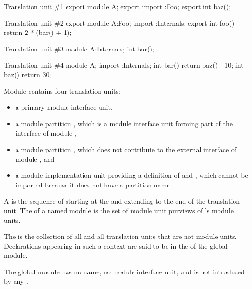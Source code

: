 \pnum
\begin{example}
\begin{codeblocktu}{Translation unit \#1}
export module A;
export import :Foo;
export int baz();
\end{codeblocktu}

\begin{codeblocktu}{Translation unit \#2}
export module A:Foo;
import :Internals;
export int foo() { return 2 * (bar() + 1); }
\end{codeblocktu}

\begin{codeblocktu}{Translation unit \#3}
module A:Internals;
int bar();
\end{codeblocktu}

\begin{codeblocktu}{Translation unit \#4}
module A;
import :Internals;
int bar() { return baz() - 10; }
int baz() { return 30; }
\end{codeblocktu}

Module  contains four translation units:
\begin{itemize}
\item a primary module interface unit,
\item a module partition , which is a module interface unit
forming part of the interface of module ,
\item a module partition , which does not contribute
to the external interface of module , and
\item a module implementation unit providing
a definition of  and ,
which cannot be imported because
it does not have a partition name.
\end{itemize}
\end{example}

\pnum
A  is
the sequence of 
starting at the 
and extending to the end of the translation unit.
The 
of a named module  is the set of module unit purviews
of 's module units. 

\pnum
The  is the collection of all
and all translation units that are not module units.
Declarations appearing in such a context
are said to be in the  of the global module.
\begin{note}
The global module has no name, no module interface unit, and is not
introduced by any .
\end{note}

